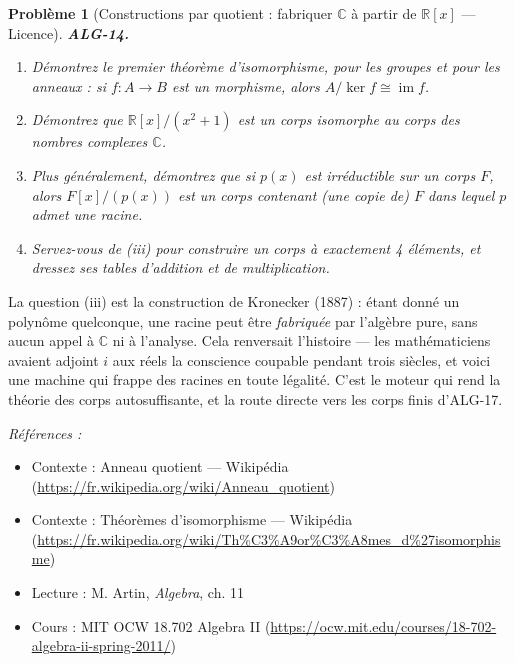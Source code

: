 \documentclass[11pt]{article}
\newtheorem{problem}{Problème}
\newenvironment{refs}{\par\small\noindent\emph{Références :}\begin{itemize}\setlength\itemsep{0pt}}{\end{itemize}\normalsize}
\begin{document}
\begin{problem}[{Constructions par quotient : fabriquer $\mathbb{C}$ à partir de $\mathbb{R}[x]$ --- Licence}]
\textbf{ALG-14.} \begin{enumerate}
\item[(i)] Démontrez le premier théorème d'isomorphisme, pour les groupes et pour
les anneaux : si $f : A \to B$ est un morphisme, alors $A/\ker f \cong \operatorname{im} f$.
\item[(ii)] Démontrez que $\mathbb{R}[x]/(x^2 + 1)$ est un corps isomorphe au corps des nombres complexes
$\mathbb{C}$.
\item[(iii)] Plus généralement, démontrez que si $p(x)$ est irréductible sur un corps $F$,
alors $F[x]/(p(x))$ est un corps contenant (une copie de) $F$ dans lequel $p$ admet une racine.
\item[(iv)] Servez-vous de (iii) pour construire un corps à exactement 4 éléments, et dressez ses tables d'addition
et de multiplication.
\end{enumerate}

\end{problem}

\noindent La question (iii) est la construction de Kronecker (1887) : étant donné un polynôme
quelconque, une racine peut être \textit{fabriquée} par l'algèbre pure, sans aucun appel à $\mathbb{C}$ ni à
l'analyse. Cela renversait l'histoire --- les mathématiciens avaient adjoint $i$ aux réels la conscience
coupable pendant trois siècles, et voici une machine qui frappe des racines en toute légalité. C'est le moteur
qui rend la théorie des corps autosuffisante, et la route directe vers les corps finis d'ALG-17.

\begin{refs}
\item Contexte : Anneau quotient --- Wikipédia (\url{https://fr.wikipedia.org/wiki/Anneau_quotient})
\item Contexte : Théorèmes d'isomorphisme --- Wikipédia (\url{https://fr.wikipedia.org/wiki/Th%C3%A9or%C3%A8mes_d%27isomorphisme})
\item Lecture : M. Artin, \textit{Algebra}, ch. 11
\item Cours : MIT OCW 18.702 Algebra II (\url{https://ocw.mit.edu/courses/18-702-algebra-ii-spring-2011/})
\end{refs}

\bigskip
\end{document}

